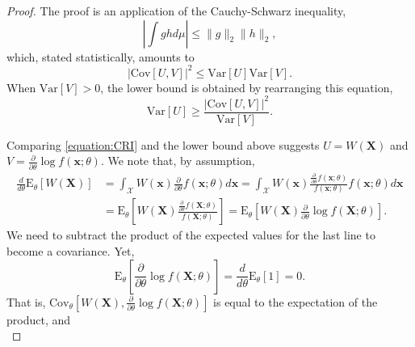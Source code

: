 \begin{proof}
The proof is an application of the Cauchy-Schwarz inequality,
\begin{equation*}
\left| \int g h d\mu \right| \leq \| g \|_2 \| h \|_2 ,
\end{equation*}
which, stated statistically, amounts to
\begin{equation*}
\left| \mathrm{Cov}[U, V] \right|^2
\leq \mathrm{Var}[U] \mathrm{Var}[V] .
\end{equation*}
When $\mathrm{Var} [V] > 0$, the lower bound is obtained by rearranging this equation,
\begin{equation*}
\mathrm{Var}[U] \geq
\frac{\left| \mathrm{Cov}[U, V] \right|^2}{\mathrm{Var}[V]} .
\end{equation*}

Comparing \eqref{equation:CRI} and the lower bound above suggests $U = W(\mathbf{X})$ and $V = \frac{\partial}{\partial \theta} \log f(\mathbf{x}; \theta)$.
We note that, by assumption,
\begin{equation*}
\begin{split}
\frac{d}{d\theta} \mathrm{E}_{\theta} \left[ W(\mathbf{X}) \right]
&= \int_{\mathcal{X}} W(\mathbf{x}) \frac{\partial}{\partial \theta} f(\mathbf{x}; \theta) d\mathbf{x}
= \int_{\mathcal{X}} W(\mathbf{x}) \frac{\frac{\partial}{\partial \theta} f(\mathbf{x}; \theta)}{f(\mathbf{x}; \theta)} f(\mathbf{x}; \theta) d\mathbf{x} \\
&= \mathrm{E}_{\theta} \left[ W(\mathbf{X}) \frac{\frac{\partial}{\partial \theta} f(\mathbf{X}; \theta)}{f(\mathbf{X}; \theta)} \right]
= \mathrm{E}_{\theta} \left[ W(\mathbf{X}) \frac{\partial}{\partial \theta} \log f(\mathbf{X}; \theta) \right] .
\end{split}
\end{equation*}
We need to subtract the product of the expected values for the last line to become a covariance.
Yet,
\begin{equation*}
\mathrm{E}_{\theta} \left[ \frac{\partial}{\partial \theta} \log f(\mathbf{X}; \theta) \right]
= \frac{d}{d \theta} \mathrm{E}_{\theta} \left[ 1 \right] = 0 .
\end{equation*}
That is, $\mathrm{Cov}_{\theta} \left[ W(\mathbf{X}), \frac{\partial}{\partial \theta} \log f(\mathbf{X}; \theta) \right]$ is equal to the expectation of the product, and 
\begin{equation*}

\end{equation*}
\end{proof}

